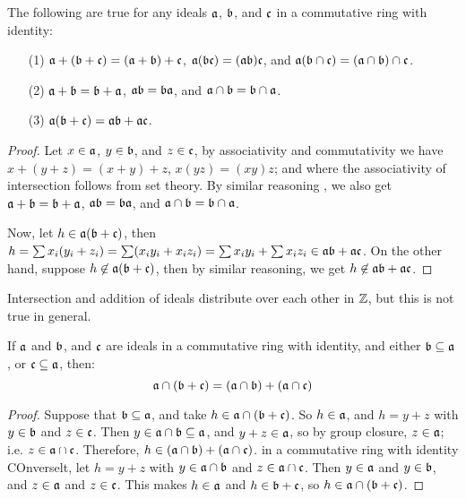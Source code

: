 \begin{theorem}\label{theorem_5.5.7}
  The following are true for any ideals $\af$,  $\bf$, and $\cf$ in a
  commutative ring with identity:
  \begin{enumerate}
    \item[(1)] $\af+(\bf+\cf)=(\af+\bf)+\cf$, $\af(\bf\cf)=(\af\bf)\cf$, and
      $\af (\bf \cap \cf)=(\af \cap \bf) \cap \cf$.

    \item[(2)] $\af+\bf=\bf+\af$, $\af\bf=\bf\af$, and  $\af \cap \bf=\bf \cap
      \af$.

    \item[(3)] $\af(\bf+\cf)=\af\bf+\af\cf$.
  \end{enumerate}
\end{theorem}
\begin{proof}
  Let $x \in \af$, $y \in \bf$, and $z \in \cf$, by associativity and
  commutativity we have $x+(y+z)=(x+y)+z$, $x(yz)=(xy)z$; and where the
  associativity of intersection follows from set theory. By similar reasoning ,
  we also get  $\af+\bf=\bf+\af$,  $\af\bf=\bf\af$, and  $\af \cap \bf=\bf \cap
  \af$.

  Now, let  $h \in \af(\bf+\cf)$, then
  $h=\sum{x_i(y_i+z_i)}=\sum(x_iy_i+x_iz_i)=\sum{x_iy_i}+\sum{x_iz_i} \in
  \af\bf+\af\cf$. On the other hand, suppose $h \not\in \af(\bf+\cf)$, then by
  similar reasoning, we get $h \not\in \af\bf+\af\cf$.
\end{proof}

\begin{example}\label{example_5.18}
  Intersection and addition of ideals distribute over each other in $\Z$, but
  this is not true in general.
\end{example}

\begin{theorem}[Modularity]\label{theorem_5.5.8}
  If $\af$ and $\bf$, and $\cf$ are ideals in a commutative ring with
  identity, and either $\bf \subseteq \af$, or
  $\cf \subseteq \af$, then:
  \begin{equation*}
    \af \cap (\bf+\cf)=(\af \cap \bf)+(\af \cap \cf)
  \end{equation*}
\end{theorem}
\begin{proof}
  Suppose that $\bf \subseteq \af$, and take $h \in \af \cap (\bf+\cf)$. So $h
  \in \af$, and $h=y+z$ with  $y \in \bf$ and $z \in \cf$. Then $y \in \af \cap
  \bf \subseteq \af$, and $y+z \in \af$, so by group closure, $z \in \af$; i.e.
  $z \in \af \cap \cf$. Therefore, $h \in (\af \cap \bf)+(\af \cap \cf)$.
 in a commutative ring with identity
  COnverselt, let $h=y+z$ with  $y \in \af \cap \bf$ and $z \in \af \cap \cf$.
  Then $y \in \af$ and $y \in \bf$, and $z \in \af$ and $z \in \cf$. This makes
  $h \in \af$ and $h \in \bf+\cf$, so $h \in \af \cap (\bf+\cf)$.
\end{proof}

